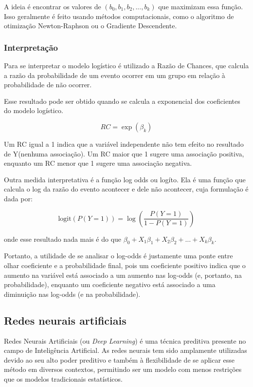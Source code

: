 A ideia é encontrar os valores de $(b_0, b_1, b_2, ..., b_k)$ que maximizam essa função. Isso geralmente é feito usando métodos computacionais, 
como o algoritmo de otimização Newton-Raphson ou o Gradiente Descendente.

\subsubsection{Interpretação}


Para se interpretar o modelo logístico é utilizado a Razão de Chances, que calcula a razão da
probabilidade de um evento ocorrer em um grupo em relação à probabilidade de não ocorrer. 

Esse resultado pode ser obtido quando se calcula a exponencial dos coeficientes do modelo logístico.

\begin{equation}
  RC = \exp{(\beta_k)}
\end{equation}

Um RC igual a 1 indica que a variável independente não tem efeito no resultado de Y(nenhuma associação).
Um RC maior que 1 sugere uma associação positiva, enquanto um RC menor que 1 sugere uma associação negativa.

Outra medida interpretativa é a função log odds ou logíto. Ela é uma função que calcula o log da 
razão do evento acontecer e dele não acontecer, cuja formulação é dada por:

\begin{equation}
  \text{logit}(P(Y=1)) = \log \left( \frac{P(Y=1)}{1 - P(Y=1)} \right)
\end{equation}

\noindent onde esse resultado nada mais é do que $\beta_0 + X_{1}\beta_1 + X_{2}\beta_2 + \ldots +X_{k}\beta_k$. 

Portanto, a utilidade de se analisar o log-odds é justamente uma ponte entre olhar coeficiente e a probabilidade final, 
pois um coeficiente positivo indica que o aumento na variável está associado a um aumento nas log-odds 
(e, portanto, na probabilidade), enquanto um coeficiente negativo está associado a uma diminuição nas log-odds (e na probabilidade).


\subsection{Redes neurais artificiais}

Redes Neurais Artificiais (ou \textit{Deep Learning}) é uma técnica preditiva presente no campo de Inteligência Artificial. As redes neurais tem sido amplamente utilizadas devido ao seu alto poder preditivo e também à flexibilidade de se aplicar esse método em diversos contextos, permitindo ser um modelo com menos restrições que os modelos tradicionais estatísticos.


